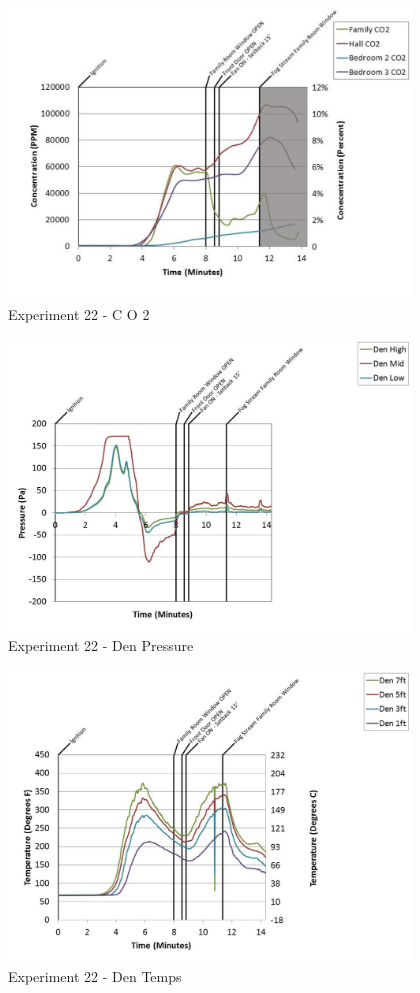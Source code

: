 \documentclass{article}
\begin{document}
\begin{appendices}
	\begin{figure}[h!]
		\centering
		\includegraphics[height=3.05in]{0_Images/Results_Charts/Exp_22_Charts/CO2.pdf}
		\caption{Experiment 22 - C O 2}
	\end{figure}
 
	\clearpage

	\begin{figure}[h!]
		\centering
		\includegraphics[height=3.05in]{0_Images/Results_Charts/Exp_22_Charts/DenPressure.pdf}
		\caption{Experiment 22 - Den Pressure}
	\end{figure}
 

	\begin{figure}[h!]
		\centering
		\includegraphics[height=3.05in]{0_Images/Results_Charts/Exp_22_Charts/DenTemps.pdf}
		\caption{Experiment 22 - Den Temps}
	\end{figure}
 

\end{appendices}
\end{document}
